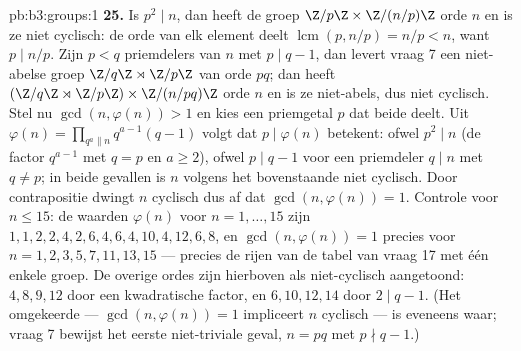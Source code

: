 \begin{solution}{pb:b3:groups:1}
\textbf{25.} Is $p^2 \mid n$, dan heeft de groep $\Z/p\Z \times
\Z/(n/p)\Z$ orde $n$ en is ze niet cyclisch: de orde van elk
element deelt $\operatorname{lcm}(p, n/p) = n/p < n$, want $p \mid
n/p$. Zijn $p < q$ priemdelers van $n$ met $p \mid q - 1$, dan
levert vraag 7 een niet-abelse groep $\Z/q\Z \rtimes \Z/p\Z$ van
orde $pq$; dan heeft $(\Z/q\Z \rtimes \Z/p\Z) \times \Z/(n/pq)\Z$
orde $n$ en is ze niet-abels, dus niet cyclisch. Stel nu $\gcd(n,
\varphi(n)) > 1$ en kies een priemgetal $p$ dat beide deelt. Uit
$\varphi(n) = \prod_{q^a \parallel n} q^{a-1}(q - 1)$ volgt dat $p
\mid \varphi(n)$ betekent: ofwel $p^2 \mid n$ (de factor $q^{a-1}$
met $q = p$ en $a \geq 2$), ofwel $p \mid q - 1$ voor een
priemdeler $q \mid n$ met $q \neq p$; in beide gevallen is $n$
volgens het bovenstaande niet cyclisch. Door contrapositie dwingt
$n$ cyclisch dus af dat $\gcd(n, \varphi(n)) = 1$. Controle voor $n
\leq 15$: de waarden $\varphi(n)$ voor $n = 1, \dots, 15$ zijn $1,
1, 2, 2, 4, 2, 6, 4, 6, 4, 10, 4, 12, 6, 8$, en $\gcd(n,
\varphi(n)) = 1$ precies voor $n = 1, 2, 3, 5, 7, 11, 13, 15$ ---
precies de rijen van de tabel van vraag 17 met één enkele groep. De
overige ordes zijn hierboven als niet-cyclisch aangetoond: $4, 8,
9, 12$ door een kwadratische factor, en $6, 10, 12, 14$ door $2
\mid q - 1$. (Het omgekeerde --- $\gcd(n, \varphi(n)) = 1$
impliceert $n$ cyclisch --- is eveneens waar; vraag 7 bewijst het
eerste niet-triviale geval, $n = pq$ met $p \nmid q - 1$.)
\end{solution}
